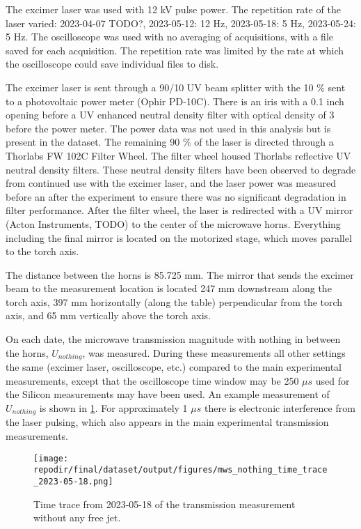 The excimer laser was used with 12 kV pulse power. The repetition rate of the laser varied: 2023-04-07 TODO?, 2023-05-12: 12 Hz, 2023-05-18: 5 Hz, 2023-05-24: 5 Hz. The oscilloscope was used with no averaging of acquisitions, with a file saved for each acquisition. The repetition rate was limited by the rate at which the oscilloscope could save individual files to disk. 

The excimer laser is sent through a 90/10 UV beam splitter with the 10 \% sent to a photovoltaic power meter (Ophir PD-10C). There is an iris with a 0.1 inch opening before a UV enhanced neutral density filter with optical density of 3 before the power meter. The power data was not used in this analysis but is present in the dataset. The remaining 90 \% of the laser is directed through a Thorlabs FW 102C Filter Wheel. The filter wheel housed Thorlabs reflective UV neutral density filters. These neutral density filters have been observed to degrade from continued use with the excimer laser, and the laser power was measured before an after the experiment to ensure there was no significant degradation in filter performance. After the filter wheel, the laser is redirected with a UV mirror (Acton Instruments, TODO) to the center of the microwave horns. Everything including the final mirror is located on the motorized stage, which moves parallel to the torch axis.  

The distance between the horns is 85.725 mm. The mirror that sends the excimer beam to the measurement location is located 247 mm downstream along the torch axis, 397 mm horizontally (along the table) perpendicular from the torch axis, and 65 mm vertically above the torch axis. 

On each date, the microwave transmission magnitude with nothing in between the horns, $U_{nothing}$, was measured. During these measurements all other settings the same (excimer laser, oscilloscope, etc.) compared to the main experimental measurements, except that the oscilloscope time window may be 250 $\mu s$ used for the Silicon measurements may have been used. An example measurement of $U_{nothing}$ is shown in \ref{fig:SI_MWS_nothing_time_trace}. For approximately 1 $\mu s$ there is electronic interference from the laser pulsing, which also appears in the main experimental transmission measurements. 



\begin{figure}[]
\centering
\texttt{[image: \\repodir/final/dataset/output/figures/mws\_nothing\_time\_trace\_2023-05-18.png]}
\caption{Time trace from 2023-05-18 of the transmission measurement without any free jet.}
\label{fig:SI_MWS_nothing_time_trace}
\end{figure}


